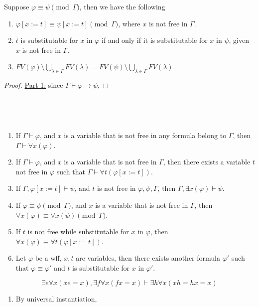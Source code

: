 \documentclass{treatise}
\begin{document}
\begin{shaded}	
\begin{lemma}
Suppose $\varphi \equiv \psi \pmod{\Gamma}$, then we have the following
\begin{enumerate}
    \item $\varphi[x := t] \equiv \psi[x := t] \pmod{\Gamma}$, where $x$ is not free in $\Gamma$.
    \item $t$ is substitutable for $x$ in $\varphi$ if and only if it is substitutable for $x$ in $\psi$, given $x$ is not free in $\Gamma$.
    \item $FV(\varphi) \setminus \bigcup_{\lambda \in \Gamma} FV(\lambda) = FV(\psi) \setminus \bigcup_{\lambda \in \Gamma} FV(\lambda)$.
\end{enumerate}
\end{lemma}
\begin{proof}
\underline{Part 1:} since $\Gamma \vdash \varphi \to \psi$,
\end{proof}
\ \\
\begin{theorem} \ 
\begin{enumerate}
    \item If $\Gamma \vdash \varphi$, and $x$ is a variable that is not free in any formula belong to $\Gamma$, then $\Gamma \vdash \forall x (\varphi)$.
    \item If $\Gamma \vdash \varphi$, and $x$ is a variable that is not free in $\Gamma$, then there exists a variable $t$ not free in $\varphi$ such that $\Gamma \vdash \forall t (\varphi[x := t])$.
    \item If $\Gamma, \varphi[x := t] \vdash \psi$, and $t$ is not free in $\varphi, \psi, \Gamma$, then $\Gamma, \exists x (\varphi) \vdash \psi$.
    \\
    \item If $\varphi \equiv \psi \pmod{\Gamma}$, and $x$ is a variable that is not free in $\Gamma$, then $\forall x (\varphi) \equiv \forall x (\psi)
 \pmod{\Gamma}$.
    \\
    \item If $t$ is not free while substitutable for $x$ in $\varphi$,  then $\forall x (\varphi) \equiv \forall t (\varphi[x := t])$.
    \item Let $\varphi$ be a wff, $x, t$ are variables, then there exists another formula $\varphi'$ such that $\varphi \equiv \varphi'$ and $t$ is substitutable for $x$ in $\varphi'$.
\end{enumerate}
\end{theorem}
\begin{example}
$$\exists e \forall x (xe = x), \exists f \forall x (fx = x) \vdash \exists h \forall x (xh = hx = x)$$
\begin{enumerate}
    \item By universal instantiation,
\end{enumerate}
\end{example}


\end{shaded}
\end{document}
